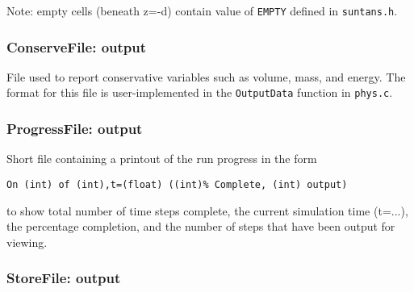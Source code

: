 \documentclass[12pt,oneside]{article}
\begin{document}
\bigskip
\noindent
Note: empty cells (beneath z=-d) contain value of \verb+EMPTY+ defined in \verb+suntans.h+.

\subsubsection{ConserveFile: output}

File used to report conservative variables such as volume, mass, and energy.  The format for this file
is user-implemented in the \verb+OutputData+ function in \verb+phys.c+.

\subsubsection{ProgressFile: output}

Short file containing a printout of the run progress in the form
\begin{verbatim}
On (int) of (int),t=(float) ((int)% Complete, (int) output)
\end{verbatim}
to show total number of time steps complete, the current simulation time (t=...), 
the percentage completion, and the number of steps that have been output for
viewing.

\subsubsection{StoreFile: output}
\end{document}
